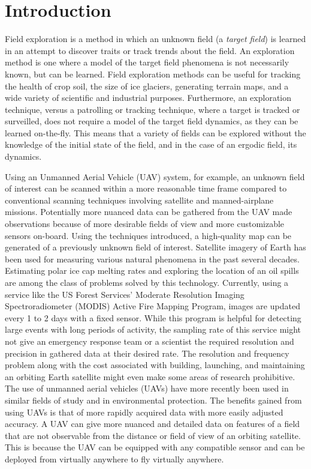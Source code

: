 
\chapter{Introduction}
Field exploration is a method in which an unknown field (a \textit{target field}) is learned in an attempt to discover traits or track trends about the field. An exploration method is one where a model of the target field phenomena is not necessarily known, but can be learned. Field exploration methods can be useful for tracking the health of crop soil, the size of ice glaciers, generating terrain maps, and a wide variety of scientific and industrial purposes. Furthermore, an exploration technique, versus a patrolling or tracking technique, where a target is tracked or surveilled, does not require a model of the target field dynamics, as they can be learned on-the-fly. This means that a variety of fields can be explored without the knowledge of the initial state of the field, and in the case of an ergodic field, its dynamics.

Using an Unmanned Aerial Vehicle (UAV) system, for example, an unknown field of interest can be scanned within a more reasonable time frame compared to conventional scanning techniques involving satellite and manned-airplane missions. Potentially more nuanced data can be gathered from the UAV made observations because of more desirable fields of view and more customizable sensors on-board. Using the techniques introduced, a high-quality map can be generated of a previously unknown field of interest. Satellite imagery of Earth has been used for measuring various natural phenomena in the past several decades. Estimating polar ice cap melting rates and exploring the location of an oil spills are among the class of problems solved by this technology. Currently, using a service like the US Forest Services' Moderate Resolution Imaging Spectroradiometer (MODIS) Active Fire Mapping Program, images are updated every 1 to 2 days with a fixed sensor. While this program is helpful for detecting large events with long periods of activity, the sampling rate of this service might not give an emergency response team or a scientist the required resolution and precision in gathered data at their desired rate. The resolution and frequency problem along with the cost associated with building, launching, and maintaining an orbiting Earth satellite might even make some areas of research prohibitive. The use of unmanned aerial vehicles (UAVs) have more recently been used in similar fields of study and in environmental protection. The benefits gained from using UAVs is that of more rapidly acquired data with more easily adjusted accuracy. A UAV can give more nuanced and detailed data on features of a field that are not observable from the distance or field of view of an orbiting satellite. This is because the UAV can be equipped with any compatible sensor and can be deployed from virtually anywhere to fly virtually anywhere.

